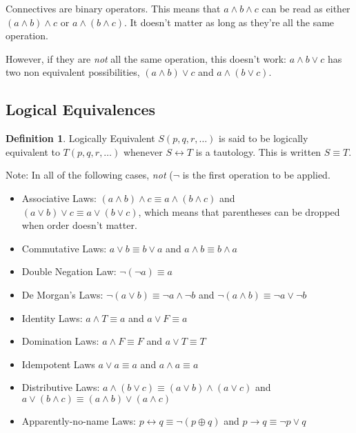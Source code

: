 \documentclass{article}
\theoremstyle{definition}
\newtheorem{definition}{Definition}[section]
\begin{document}
Connectives are binary operators. This means that $a \land b \land c$ can be
read as either $(a \land b) \land c$ or $a \land (b \land c)$. It doesn't
matter as long as they're all the same operation. 

However, if they are \textit{not} all the same operation, this doesn't work: $a \land b \lor c$ has two non equivalent possibilities, $(a \land b) \lor c$ and $a \land (b \lor c)$.

\subsection*{Logical Equivalences}

\begin{definition}{Logically Equivalent}
  $S(p, q, r, \ldots)$ is said to be logically equivalent to $T(p, q, r, \ldots)$ whenever $S \leftrightarrow T$ is a tautology. This is written $S \equiv T$.
\end{definition}

Note: In all of the following cases, \textit{not} ($\neg$ is the first operation to be applied.

\begin{itemize}
  \item Associative Laws:
    $(a \land b) \land c \equiv a \land (b \land c)$ and
    $(a \lor b) \lor c \equiv a \lor (b \lor c)$, which means that parentheses
    can be dropped when order doesn't matter.
  \item Commutative Laws:
    $a \lor b \equiv b \lor a$ and $a \land b \equiv b \land a$
  \item Double Negation Law:
    $\neg(\neg a) \equiv a$
  \item De Morgan's Laws:
    $\neg(a \lor b) \equiv \neg a \land \neg b$ and
    $\neg(a \land b) \equiv \neg a \lor \neg b$
  \item Identity Laws:
    $a \land T \equiv a$ and
    $a \lor F \equiv a$
  \item Domination Laws:
    $a \land F \equiv F$ and
    $a \lor T \equiv T$
  \item Idempotent Laws
    $a \lor a \equiv a$ and
    $a \land a \equiv a$
  \item Distributive Laws:
    $a \land (b \lor c) \equiv (a \lor b) \land (a \lor c)$ and
    $a \lor (b \land c) \equiv (a \land b) \lor (a \land c)$
  \item Apparently-no-name Laws:
    $p \leftrightarrow q \equiv \neg (p \oplus q)$ and
    $p \rightarrow q \equiv \neg p \lor q$
\end{itemize}
\end{document}

